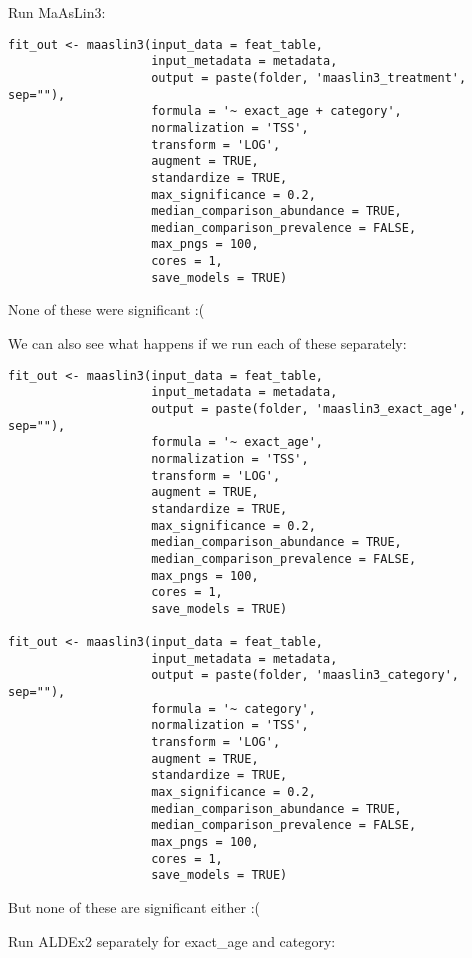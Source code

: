 \documentclass[
]{book}
\begin{document}
Run MaAsLin3:

\begin{verbatim}
fit_out <- maaslin3(input_data = feat_table,
                    input_metadata = metadata,
                    output = paste(folder, 'maaslin3_treatment', sep=""),
                    formula = '~ exact_age + category',
                    normalization = 'TSS',
                    transform = 'LOG',
                    augment = TRUE,
                    standardize = TRUE,
                    max_significance = 0.2,
                    median_comparison_abundance = TRUE,
                    median_comparison_prevalence = FALSE,
                    max_pngs = 100,
                    cores = 1,
                    save_models = TRUE)
\end{verbatim}

None of these were significant :(

We can also see what happens if we run each of these separately:

\begin{verbatim}
fit_out <- maaslin3(input_data = feat_table,
                    input_metadata = metadata,
                    output = paste(folder, 'maaslin3_exact_age', sep=""),
                    formula = '~ exact_age',
                    normalization = 'TSS',
                    transform = 'LOG',
                    augment = TRUE,
                    standardize = TRUE,
                    max_significance = 0.2,
                    median_comparison_abundance = TRUE,
                    median_comparison_prevalence = FALSE,
                    max_pngs = 100,
                    cores = 1,
                    save_models = TRUE)

fit_out <- maaslin3(input_data = feat_table,
                    input_metadata = metadata,
                    output = paste(folder, 'maaslin3_category', sep=""),
                    formula = '~ category',
                    normalization = 'TSS',
                    transform = 'LOG',
                    augment = TRUE,
                    standardize = TRUE,
                    max_significance = 0.2,
                    median_comparison_abundance = TRUE,
                    median_comparison_prevalence = FALSE,
                    max_pngs = 100,
                    cores = 1,
                    save_models = TRUE)
\end{verbatim}

But none of these are significant either :(

Run ALDEx2 separately for exact\_age and category:
\end{document}
